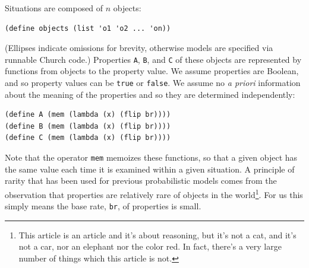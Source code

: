 \documentclass[10pt,letterpaper]{article}
\begin{document}
Situations are composed of $n$ objects:
\begin{lstlisting}
(define objects (list 'o1 'o2 ... 'on))
\end{lstlisting}
(Ellipses indicate omissions for brevity, otherwise models are specified via runnable Church code.)
Properties \lstinline{A}, \lstinline{B}, and \lstinline{C} of these objects are represented by functions from objects to the property value. We assume properties are Boolean, and so property values can be \lstinline{true} or \lstinline{false}. We assume no \emph{a priori} information about the meaning of the properties and so they are determined independently:
\begin{lstlisting}
(define A (mem (lambda (x) (flip br))))
(define B (mem (lambda (x) (flip br))))
(define C (mem (lambda (x) (flip br))))
\end{lstlisting}
Note that the operator \lstinline{mem} memoizes these functions, so that a given object has the same value each time it is examined within a given situation. 
A principle of rarity that has been used for previous probabilistic models \cite{Oaksford1994} comes from the observation that properties are relatively rare of objects in the world\footnote{This article is an article and it's about reasoning, but it's not a cat, and it's not a car, nor an elephant nor the color red. In fact, there's a very large number of things which this article is not.}. For us this simply means the base rate, \lstinline{br}, of properties is small.  

%
\end{document}
